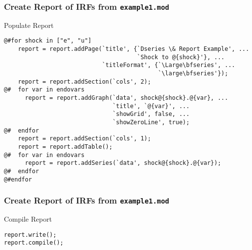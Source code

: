 \documentclass[10pt]{beamer}
\begin{document}
\begin{frame}[fragile=singleslide]
  \frametitle{Create Report of IRFs from \texttt{example1.mod}}
  \begin{block}{Populate Report}
\small{
\begin{verbatim}
@#for shock in ["e", "u"]
    report = report.addPage(`title', {`Dseries \& Report Example', ...
                                      `Shock to @{shock}'}, ...
                            `titleFormat', {`\Large\bfseries', ...
                                            `\large\bfseries'});
    report = report.addSection(`cols', 2);
@#  for var in endovars
      report = report.addGraph(`data', shock@{shock}.@{var}, ...
                               `title', `@{var}', ...
                               `showGrid', false, ...
                               `showZeroLine', true);
@#  endfor
    report = report.addSection(`cols', 1);
    report = report.addTable();
@#  for var in endovars
      report = report.addSeries(`data', shock@{shock}.@{var});
@#  endfor
@#endfor
\end{verbatim}
}
  \end{block}
\end{frame}


\begin{frame}[fragile=singleslide]
  \frametitle{Create Report of IRFs from \texttt{example1.mod}}
  \begin{block}{Compile Report}
\begin{verbatim}
report.write();
report.compile();
\end{verbatim}
  \end{block}
\end{frame}
\end{document}
